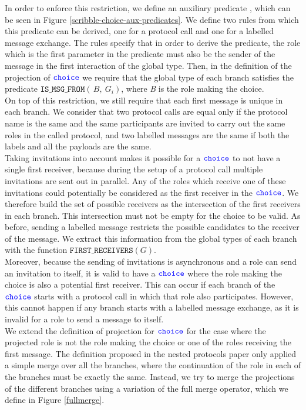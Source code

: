 \documentclass[12pt,twoside]{report}
\begin{document}
In order to enforce this restriction, we define an auxiliary predicate \texttt{}, which can be seen in Figure \ref{scribble-choice-aux-predicates}. We define two rules from which this predicate can be derived, one for a protocol call and one for a labelled message exchange. The rules specify that in order to derive the predicate, the role which is the first parameter in the predicate must also be the sender of the message in the first interaction of the global type. Then, in the definition of the projection of ${\color{blue}\mathtt{choice}}$ we require that the global type of each branch satisfies the predicate $\mathtt{IS\_MSG\_FROM}(\,B,\ G_i)$, where \textit{B} is the role making the choice.\\

On top of this restriction, we still require that each first message is unique in each branch. We consider that two protocol calls are equal only if the protocol name is the same and the same participants are invited to carry out the same roles in the called protocol, and two labelled messages are the same if both the labels and all the payloads are the same.\\

Taking invitations into account makes it possible for a ${\color{blue}\mathtt{choice}}$ to not have a single first receiver, because during the setup of a protocol call multiple invitations are sent out in parallel. Any of the roles which receive one of these invitations could potentially be considered as the first receiver in the ${\color{blue}\mathtt{choice}}$. We therefore build the set of possible receivers as the intersection of the first receivers in each branch. This intersection must not be empty for the choice to be valid. As before, sending a labelled message restricts the possible candidates to the receiver of the message. We extract this information from the global types of each branch with the function $\mathtt{FIRST\_RECEIVERS}(G)$.\\

Moreover, because the sending of invitations is asynchronous and a role can send an invitation to itself, it is valid to have a ${\color{blue}\mathtt{choice}}$ where the role making the choice is also a potential first receiver. This can occur if each branch of the ${\color{blue}\mathtt{choice}}$ starts with a protocol call in which that role also participates. However, this cannot happen if any branch starts with a labelled message exchange, as it is invalid for a role to send a message to itself.\\

We extend the definition of projection for ${\color{blue}\mathtt{choice}}$ for the case where the projected role is not the role making the choice  or one of the roles receiving the first message. The definition proposed in the nested protocols paper only applied a simple merge over all the branches, where the continuation of the role in each of the branches must be exactly the same. Instead, we try to merge the projections of the different branches using a variation of the full merge operator, which we define in Figure \ref{fullmerge}.\\
\end{document}
